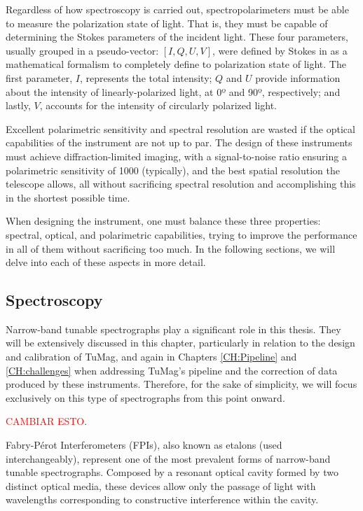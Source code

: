 Regardless of how spectroscopy is carried out, spectropolarimeters must be able to measure the polarization state of light. That is, they must be capable of determining the Stokes parameters  of the incident light. These four parameters, usually grouped in a pseudo-vector: $[I, Q, U, V]$, were defined by Stokes in \cite{Stokes_vector} as a mathematical formalism to completely define to polarization state of light. The first parameter, $I$, represents the total intensity; $Q$ and $U$ provide information about the intensity of linearly-polarized light, at 0º and 90º, respectively; and lastly, $V$, accounts for the intensity of circularly polarized light. 

Excellent polarimetric sensitivity and spectral resolution are wasted if the optical capabilities of the instrument are not up to par. The design of these instruments must achieve diffraction-limited imaging, with a signal-to-noise ratio ensuring a polarimetric sensitivity of 1000 (typically), and the best spatial resolution the telescope allows, all without sacrificing spectral resolution and accomplishing this in the shortest possible time.

When designing the instrument, one must balance these three properties: spectral, optical, and polarimetric capabilities, trying to improve the performance in all of them without sacrificing too much. In the following sections, we will delve into each of these aspects in more detail.

\subsection{Spectroscopy}

Narrow-band tunable spectrographs play a significant role in this thesis. They will be extensively discussed in this chapter, particularly in relation to the design and calibration of TuMag, and again in Chapters \ref{CH:Pipeline} and \ref{CH:challenges} when addressing TuMag's pipeline and the correction of data produced by these instruments. Therefore, for the sake of simplicity, we will focus exclusively on this type of spectrographs from this point onward.

\textcolor{red}{CAMBIAR ESTO}.

Fabry-Pérot Interferometers (FPIs), also known as etalons (used interchangeably), represent one of the most prevalent forms of narrow-band tunable spectrographs. Composed by a resonant optical cavity formed by two distinct optical media, these devices allow only the passage of light with wavelengths corresponding to constructive interference within the cavity. 

